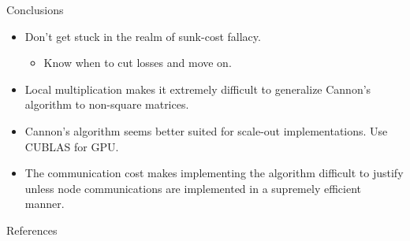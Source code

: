\documentclass{beamer}
\begin{document}
\begin{frame}{Conclusions}
  \begin{itemize}
  \item{Don't get stuck in the realm of sunk-cost fallacy.}
    \begin{itemize}
      \item{Know when to cut losses and move on.}
    \end{itemize}
  \item{Local multiplication makes it extremely difficult to generalize Cannon's algorithm to non-square matrices.}
  \item{Cannon's algorithm seems better suited for scale-out implementations. Use CUBLAS for GPU.}
  \item{The communication cost makes implementing the algorithm difficult to justify unless node communications are implemented in a supremely efficient manner.} 
  \end{itemize}
\end{frame}
\begin{frame}[allowframebreaks]{References}
  \printbibliography
\end{frame}
\end{document}
